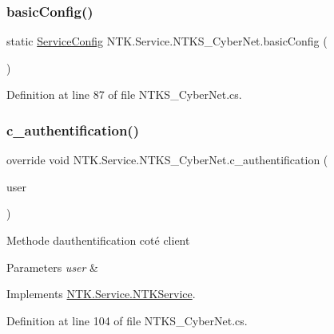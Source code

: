 \subsubsection{\texorpdfstring{basicConfig()}{basicConfig()}}
{\footnotesize\ttfamily static \mbox{\hyperlink{struct_n_t_k_1_1_service_1_1_service_config}{Service\+Config}} N\+T\+K.\+Service.\+N\+T\+K\+S\+\_\+\+Cyber\+Net.\+basic\+Config (\begin{DoxyParamCaption}{ }\end{DoxyParamCaption})\hspace{0.3cm}{\ttfamily [static]}}



Definition at line 87 of file N\+T\+K\+S\+\_\+\+Cyber\+Net.\+cs.

\mbox{\label{class_n_t_k_1_1_service_1_1_n_t_k_s___cyber_net_aafeaa95314fc42dad77b9488f10be803}} 
\subsubsection{\texorpdfstring{c\_authentification()}{c\_authentification()}}
{\footnotesize\ttfamily override void N\+T\+K.\+Service.\+N\+T\+K\+S\+\_\+\+Cyber\+Net.\+c\+\_\+authentification (\begin{DoxyParamCaption}\item[{\mbox{\hyperlink{class_n_t_k_1_1_n_t_k_user}{N\+T\+K\+User}}}]{user }\end{DoxyParamCaption})\hspace{0.3cm}{\ttfamily [virtual]}}



Methode d\textquotesingle{}authentification coté client 


\begin{DoxyParams}{Parameters}
{\em user} & \\
\hline
\end{DoxyParams}


Implements \mbox{\hyperlink{class_n_t_k_1_1_service_1_1_n_t_k_service_a8c2fd33b41da5a4edf9911682dfd36cd}{N\+T\+K.\+Service.\+N\+T\+K\+Service}}.



Definition at line 104 of file N\+T\+K\+S\+\_\+\+Cyber\+Net.\+cs.

